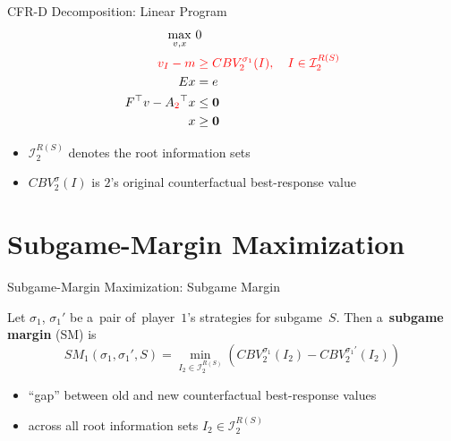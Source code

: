 \documentclass{beamer}
\theoremstyle{definition}
\newcommand{\vect}[1]{\boldsymbol{#1}}
\newcommand{\I}{\mathcal{I}}
\begin{document}
  \begin{frame}{CFR-D Decomposition: Linear Program}
    \begin{equation*}
      \label{lp:cfr-d}
      \begin{split}
        \max_{v, x}\ &0 \\
        \color{red}
        v_I - m &
        \color{red}
        \ge CBV_2^{\sigma_1}(I), \quad I \in \I_2^{R(S)}\\ 
        Ex &= e \\
        F^\top v - A_{\color{red}2}^\top x &\le \vect{0} \\
        x &\ge \vect{0}
      \end{split}
    \end{equation*}
    \pause

    \begin{itemize}[<+- | alert@+>]
      \item $\I_2^{R(S)}$ denotes the root information sets 
      \item $CBV_2^\sigma(I)$ is $2$'s original counterfactual best-response value
    \end{itemize}
  \end{frame}

  \section{Subgame-Margin Maximization}

  \begin{frame}{Subgame-Margin Maximization: Subgame Margin}
    \pause
    \begin{framed}
      Let $\sigma_1$, $\sigma_1'$ be a~pair of~player~$1$'s strategies for subgame~$S$.
      Then a~\textbf{subgame margin} (SM) is
      \[
        SM_1 (\sigma_1, \sigma_1' , S) =
        \min_{I_2 \in \I_2^{R(S)}}
        \left( CBV_2^{\sigma_1} (I_2) - CBV_2^{\sigma_1'} (I_2) \right)
      \]
    \end{framed}
    \pause

    \begin{itemize}[<+- | alert@+>]
      \item ``gap'' between old and new counterfactual best-response values
      \item across all root information sets $I_2 \in \I_2^{R(S)}$
    \end{itemize}
  \end{frame}
\end{document}
